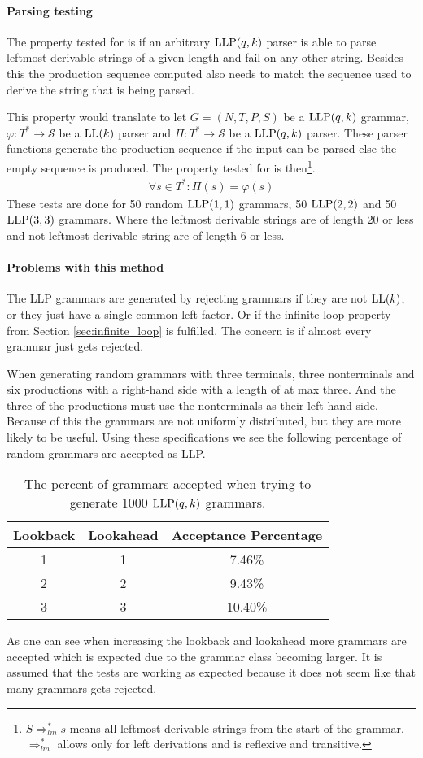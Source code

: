 \paragraph{Parsing testing}
The property tested for is if an arbitrary $\text{LLP}(q,k)$ parser is able to parse leftmost derivable strings of a given length and fail on any other string. Besides this the production sequence computed also needs to match the sequence used to derive the string that is being parsed.

This property would translate to let $G = (N, T, P, S)$ be a $\text{LLP}(q, k)$ grammar, $\varphi : T^* \to \mathcal{S}$ be a $\text{LL}(k)$ parser and $\Pi : T^* \to \mathcal{S}$ be a $\text{LLP}(q, k)$ parser. These parser functions generate the production sequence if the input can be parsed else the empty sequence is produced. The property tested for is then\footnote{$S \Rightarrow^*_{lm} s$ means all leftmost derivable strings from the start of the grammar. $\Rightarrow^*_{lm}$ allows only for left derivations and is reflexive and transitive.}.
\begin{align*}
    \forall s \in T^* : \Pi(s) = \varphi(s)
\end{align*}
These tests are done for 50 random $\text{LLP}(1,1)$ grammars, 50 $\text{LLP}(2,2)$ and 50 $\text{LLP}(3,3)$ grammars. Where the leftmost derivable strings are of length 20 or less and not leftmost derivable string are of length 6 or less.

\paragraph{Problems with this method}
The LLP grammars are generated by rejecting grammars if they are not $\text{LL}(k)$, or they just have a single common left factor. Or if the infinite loop property from Section \ref{sec:infinite_loop} is fulfilled. The concern is if almost every grammar just gets rejected.

When generating random grammars with three terminals, three nonterminals and six productions with a right-hand side with a length of at max three. And the three of the productions must use the nonterminals as their left-hand side. Because of this the grammars are not uniformly distributed, but they are more likely to be useful. Using these specifications we see the following percentage of random grammars are accepted as LLP.
\begin{table}[H]
    \centering
    \begin{tabular}{c|c|c}
        Lookback & Lookahead & Acceptance Percentage  \\ \hline
        1 & 1 & 7.46\%  \\\hline
        2 & 2 & 9.43\%  \\\hline
        3 & 3 & 10.40\%
    \end{tabular}
    \caption{The percent of grammars accepted when trying to generate 1000 $\text{LLP}(q, k)$ grammars.}
\end{table}
\noindent As one can see when increasing the lookback and lookahead more grammars are accepted which is expected due to the grammar class becoming larger. It is assumed that the tests are working as expected because it does not seem like that many grammars gets rejected.